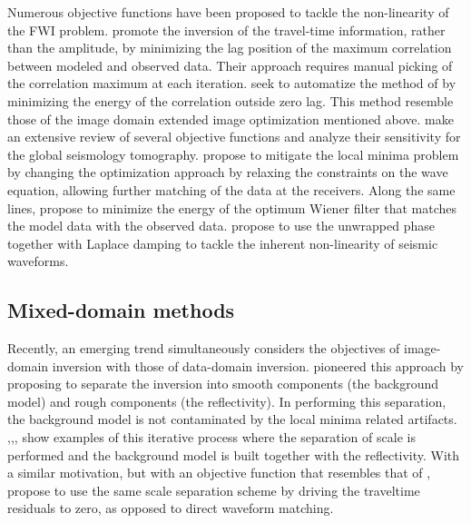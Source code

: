 Numerous objective functions have been proposed to tackle the
non-linearity of the FWI problem. \cite{Luo91} promote the inversion
of the travel-time information, rather than the amplitude, by
minimizing the lag position of the maximum correlation between
modeled and observed data. Their approach requires manual picking of
the correlation maximum at each iteration. \cite{van2010correlation}
seek to automatize the method of \cite{Luo91} by minimizing the
energy of the correlation outside zero lag. This method resemble
those of the image domain extended image optimization mentioned
above. \cite{GJI:GJI4970} make an extensive review of several
objective functions and analyze their sensitivity for the global
seismology tomography. \cite{van2013mitigating} propose to mitigate
the local minima problem by changing the optimization approach by
relaxing the constraints on the wave equation, allowing further
matching of the data at the receivers. Along the same lines,
\cite{simon,warner} propose to minimize the energy of the optimum
Wiener filter that matches the model data with the observed data.
\cite{ChoiTariq} propose to use the unwrapped phase together with
Laplace damping to tackle the inherent non-linearity of seismic
waveforms.


\subsection{Mixed-domain methods}

Recently, an emerging trend simultaneously considers the objectives
of image-domain inversion with those of data-domain inversion.
\cite{clement} pioneered this approach by proposing to separate the
inversion into smooth components (the background model) and rough
components (the reflectivity). In performing this separation, the
background model is not contaminated by the local minima related
artifacts. \cite{Xu},\cite{HWang},\cite{Zhou01092015},\cite{Zedong}
show examples of this iterative process where the separation of
scale is performed and the background model is built together with
the reflectivity. With a similar motivation, but with an objective
function that resembles that of \cite{Luo91}, \cite{MaWarping}
propose to use the same scale separation scheme by driving the
traveltime residuals to zero, as opposed to direct waveform matching.

